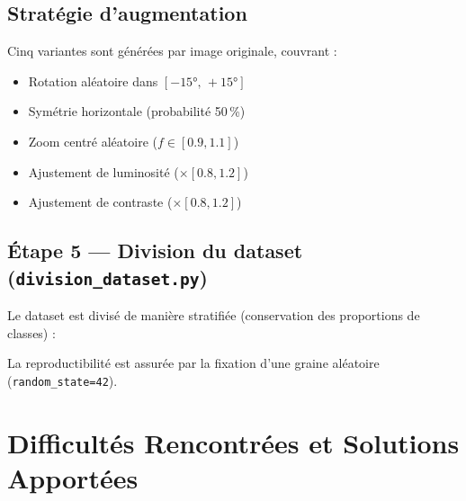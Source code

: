 \documentclass[12pt,a4paper]{article}
\begin{document}
\begin{center}
\subsection{Stratégie d'augmentation}

Cinq variantes sont générées par image originale, couvrant :

\begin{itemize}
  \item Rotation aléatoire dans $[-15°,\,+15°]$
  \item Symétrie horizontale (probabilité 50\,\%)
  \item Zoom centré aléatoire ($f \in [0.9, 1.1]$)
  \item Ajustement de luminosité ($\times [0.8, 1.2]$)
  \item Ajustement de contraste ($\times [0.8, 1.2]$)
\end{itemize}
 
\end{center}

\subsection{Étape 5 — Division du dataset (\texttt{division\_dataset.py})}

Le dataset est divisé de manière stratifiée (conservation des proportions de classes) :

\begin{center}
\end{center}

La reproductibilité est assurée par la fixation d'une graine aléatoire
(\texttt{random\_state=42}).

\section{Difficultés Rencontrées et Solutions Apportées}
\end{document}
